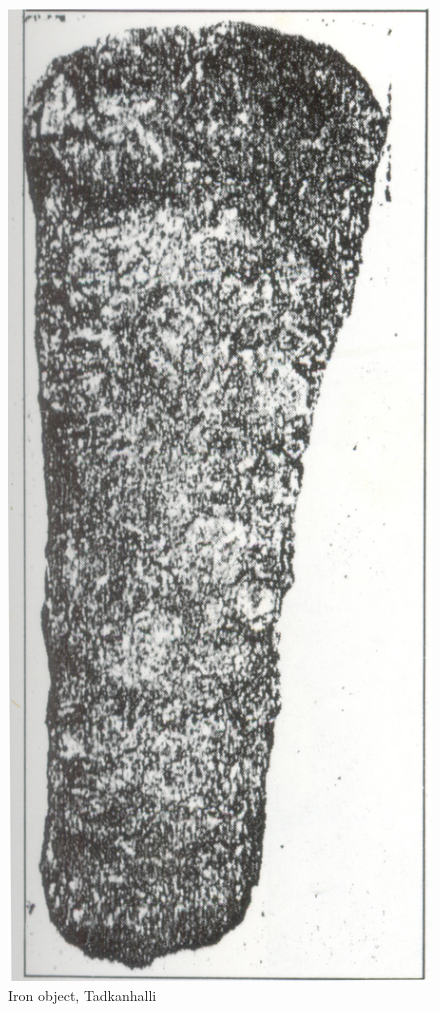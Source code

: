 \begin{figure}[H]
\renewcommand{\thefigure}{17C}
\includegraphics[scale=0.45]{images/chapter-4/fig017C.jpg}
\caption{Iron object, Tadkanhalli}\label{chapter-4-fig17C}
\end{figure}



